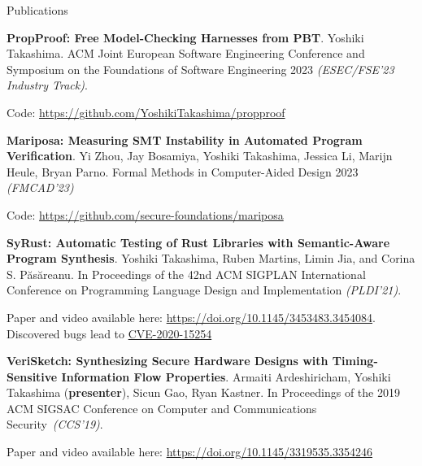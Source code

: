 \documentclass{resume} %
\begin{document}
\begin{rSection}{Publications}

  \begin{rSubsection}{}{}{}{}
  \item \textbf{PropProof: Free Model-Checking Harnesses from PBT}.
    Yoshiki Takashima. ACM Joint European Software Engineering
    Conference and Symposium on the Foundations of Software
    Engineering 2023 \textit{(ESEC/FSE’23 Industry Track)}.

    {\footnotesize Code: \href{https://github.com/YoshikiTakashima/propproof}
    {https://github.com/YoshikiTakashima/propproof}}

  \item \textbf{Mariposa: Measuring SMT Instability in Automated
      Program Verification}. Yi Zhou, Jay Bosamiya, Yoshiki Takashima,
    Jessica Li, Marijn Heule, Bryan Parno. Formal Methods in
    Computer-Aided Design 2023 \textit{(FMCAD'23)}

    {\footnotesize Code: \href{https://github.com/secure-foundations/mariposa}
    {https://github.com/secure-foundations/mariposa}}

  \item \textbf{SyRust: Automatic Testing of Rust Libraries
    with Semantic-Aware Program Synthesis}.
    Yoshiki Takashima, Ruben Martins, Limin Jia, and Corina
    S. P\u{a}s\u{a}reanu.  In Proceedings of the 42nd
    ACM SIGPLAN International Conference on Programming Language
    Design and Implementation \textit{(PLDI’21)}.

    {\footnotesize Paper and video available here:
    \href{https://doi.org/10.1145/3453483.3454084}
    {https://doi.org/10.1145/3453483.3454084}. Discovered bugs lead to
    \href{https://nvd.nist.gov/vuln/detail/CVE-2020-15254}{CVE-2020-15254}}

  \item \textbf{VeriSketch: Synthesizing Secure Hardware Designs with
      Timing-Sensitive Information Flow Properties}.  Armaiti
    Ardeshiricham, Yoshiki Takashima (\textbf{presenter}), Sicun Gao,
    Ryan Kastner. In Proceedings of the 2019 ACM SIGSAC Conference on
    Computer and Communications Security~\textit{(CCS'19)}.

    {\footnotesize Paper and video available here:
    \href{https://dl.acm.org/doi/abs/10.1145/3319535.3354246}
    {https://doi.org/10.1145/3319535.3354246}}
  \end{rSubsection}
\end{rSection}
\end{document}
